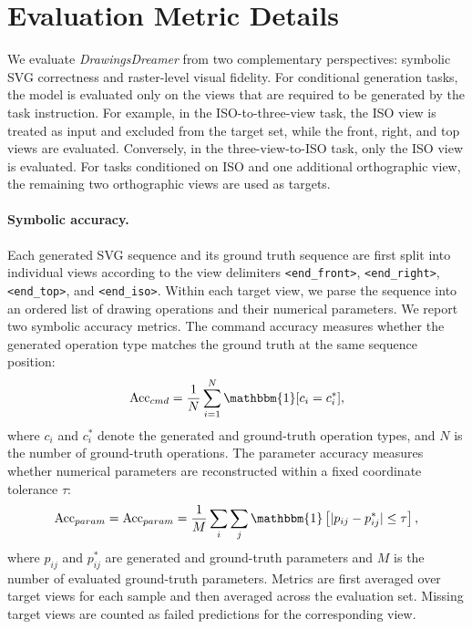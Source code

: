 \documentclass{article}
\begin{document}
\section{Evaluation Metric Details}
\label{sec: eval}
We evaluate \textit{DrawingsDreamer} from two complementary perspectives: symbolic SVG correctness and raster-level visual fidelity. For conditional generation tasks, the model is evaluated only on the views that are required to be generated by the task instruction. For example, in the ISO-to-three-view task, the ISO view is treated as input and excluded from the target set, while the front, right, and top views are evaluated. Conversely, in the three-view-to-ISO task, only the ISO view is evaluated. For tasks conditioned on ISO and one additional orthographic view, the remaining two orthographic views are used as targets.

\paragraph{Symbolic accuracy.}
Each generated SVG sequence and its ground truth sequence are first split into individual views according to the view delimiters \texttt{<end\_front>}, \texttt{<end\_right>}, \texttt{<end\_top>}, and \texttt{<end\_iso>}. Within each target view, we parse the sequence into an ordered list of drawing operations and their numerical parameters. We report two symbolic accuracy metrics. The command accuracy measures whether the generated operation type matches the ground truth at the same sequence position:
\begin{equation}
\mathrm{Acc}_{cmd} = \frac{1}{N}\sum_{i=1}^{N}\mathbbm{1}[c_i = c_i^*],
\end{equation}
where $c_i$ and $c_i^*$ denote the generated and ground-truth operation types, and $N$ is the number of ground-truth operations. The parameter accuracy measures whether numerical parameters are reconstructed within a fixed coordinate tolerance $\tau$:
\begin{equation}
\mathrm{Acc}_{param} =
\mathrm{Acc}_{param} = \frac{1}{M}\sum_i\sum_j \mathbbm{1}\left[|p_{ij}-p_{ij}^*| \leq \tau\right],
\end{equation}
where $p_{ij}$ and $p_{ij}^*$ are generated and ground-truth parameters and $M$ is the number of evaluated ground-truth parameters. Metrics are first averaged over target views for each sample and then averaged across the evaluation set. Missing target views are counted as failed predictions for the corresponding view.
\end{document}
